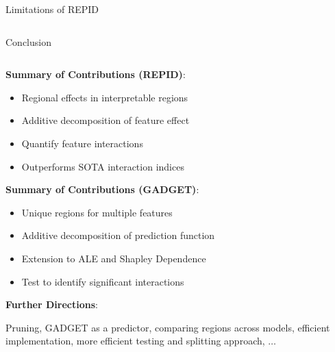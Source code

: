 \documentclass[11pt,compress,t,notes=noshow, aspectratio=169, xcolor=table,dvipsnames]{beamer}
\begin{document}
\begin{frame}{Limitations of REPID}
\begin{columns}[T, totalwidth = \textwidth]
\end{columns}
\bigskip
\end{frame}


\begin{frame}{Conclusion}

\begin{columns}[T, totalwidth = \textwidth]
    \begin{column}{0.53\textwidth}

 \textbf{Summary of Contributions (REPID)}:
 \begin{itemize}
    \item Regional effects in interpretable regions
    \item Additive decomposition of feature effect 
    \item Quantify feature interactions 
    \item Outperforms SOTA interaction indices
\end{itemize}

 \textbf{Summary of Contributions (GADGET)}:
 \begin{itemize}
 \item Unique regions for multiple features
 \item Additive decomposition of prediction function%
 \item Extension to ALE and Shapley Dependence
 \item Test to identify significant interactions
\end{itemize}

\textbf{Further Directions}: 

Pruning, GADGET as a predictor, comparing regions across models, efficient implementation, more efficient testing and splitting approach, $\dots$
 

\end{column}
\end{columns}
\end{frame}
\end{document}
